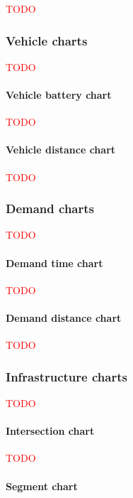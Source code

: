 \documentclass[10pt,twocolumn]{article}
\begin{document}
\textcolor{red}{TODO}

\subsubsection{Vehicle charts}

\textcolor{red}{TODO}

\paragraph{Vehicle battery chart}

\textcolor{red}{TODO}

\paragraph{Vehicle distance chart}

\textcolor{red}{TODO}

\subsubsection{Demand charts}

\textcolor{red}{TODO}

\paragraph{Demand time chart}

\textcolor{red}{TODO}

\paragraph{Demand distance chart}

\textcolor{red}{TODO}

\subsubsection{Infrastructure charts}

\textcolor{red}{TODO}

\paragraph{Intersection chart}

\textcolor{red}{TODO}

\paragraph{Segment chart}
\end{document}
